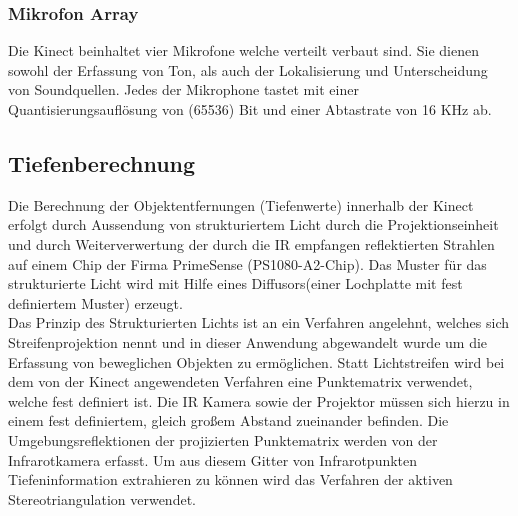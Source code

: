 \documentclass[
	12pt,
	a4paper,
	BCOR10mm,
	DIV14,
	listof=totoc,
	bibliography=totoc,
	headsepline
]{scrreprt}
\begin{document}
\subsubsection{Mikrofon Array}
Die Kinect beinhaltet vier Mikrofone welche verteilt verbaut sind. Sie dienen sowohl der Erfassung von Ton, als auch der Lokalisierung und Unterscheidung von Soundquellen. Jedes der Mikrophone tastet mit einer Quantisierungsauflösung von  (65536) Bit und einer Abtastrate von 16 KHz ab.

\subsection{Tiefenberechnung}

Die Berechnung der Objektentfernungen (Tiefenwerte) innerhalb der Kinect erfolgt durch Aussendung von strukturiertem Licht durch die Projektionseinheit und durch Weiterverwertung  der durch die IR empfangen reflektierten Strahlen auf einem Chip der Firma PrimeSense (PS1080-A2-Chip). Das Muster für das strukturierte Licht wird mit Hilfe eines Diffusors(einer Lochplatte mit fest definiertem Muster) erzeugt.\\
Das Prinzip des Strukturierten Lichts ist an ein Verfahren angelehnt, welches sich Streifenprojektion nennt und in dieser Anwendung abgewandelt wurde um die Erfassung von beweglichen Objekten zu ermöglichen. Statt Lichtstreifen wird bei dem von der Kinect angewendeten Verfahren eine Punktematrix verwendet, welche fest definiert ist. Die IR Kamera sowie der Projektor müssen sich hierzu in einem fest definiertem, gleich großem Abstand zueinander befinden.
Die Umgebungsreflektionen der projizierten Punktematrix werden von der Infrarotkamera erfasst.
Um aus diesem Gitter von Infrarotpunkten Tiefeninformation extrahieren zu können wird das Verfahren der aktiven Stereotriangulation verwendet.\\
\end{document}
